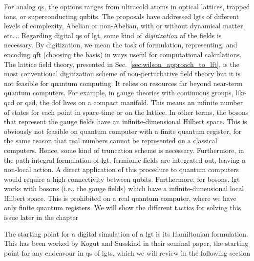 For analog \ac{qs}, the options ranges from ultracold atoms in optical lattices\citneeded, trapped ions\citneeded, or superconducting qubits\citneeded.
The proposals have addressed \ac{lgt}s of different levels of complexity, Abelian or non-Abelian, with or without dynamical matter, etc\dots.
Regarding digital \ac{qs} of \ac{lgt}, some kind of \emph{digitization} of the fields is necessary.
By digitization, we mean the task of formulation, representing, and encoding \ac{qft} (choosing the basis) in ways useful for computational calculations.
The lattice field theory, presented in Sec.~\ref{sec:wilson_approach_to_lft}, is the most conventional digitization scheme of non-perturbative field theory but it is not feasible for quantum computing.
It relies on resources far beyond near-term quantum computers.
For example, in gauge theories with continuous groups, like \ac{qcd} or \ac{qed}, the \ac{dof} lives on a compact manifold.
This means an infinite number of states for each point in space-time or on the lattice.
In other terms, the bosons that represent the gauge fields have an infinite-dimensional Hilbert space.
This is obviously not feasible on quantum computer with a finite quantum register, for the same reason that real numbers cannot be represented on a classical computers.
Hence, some kind of truncation scheme is necessary.
Furthermore, in the path-integral formulation of \ac{lgt}, fermionic fields are integrated out, leaving a non-local action.
A direct application of this procedure to quantum computers would require a high connectivity between qubits.
Furthermore, for bosons, \ac{lgt} works with bosons (i.e., the gauge fields) which have a infinite-dimensional local Hilbert space.
This is prohibited on a real quantum computer, where we have only finite quantum registers.
We will show the different tactics for solving this issue later in the chapter

The starting point for a digital simulation of a \ac{lgt} is its Hamiltonian formulation.
This has been worked by Kogut and Susskind in their seminal paper\citneeded, the starting point for any endeavour in \ac{qs} of \ac{lgt}s, which we will review in the following section


